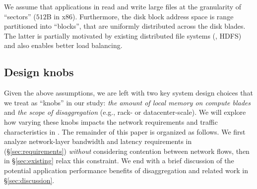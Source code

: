 
We assume that applications in \dis read and write large files at the granularity of ``sectors'' ($512$B in x86). Furthermore, the disk block address space is range partitioned into ``blocks'', that are uniformly distributed across the disk blades. The latter is partially motivated by existing distributed file systems (\eg, HDFS) and also enables better load balancing. %

\vspace{-0.1in}
\subsection{Design knobs}
\label{ssec:knobs}
\vspace{-0.05in}
Given the above assumptions, we are left with two key system design choices that we treat as ``knobs'' in our study: {\em the amount of local memory on compute blades} and  {\em the scope of disaggregation} (e.g., rack- or datacenter-scale). We will explore how varying these knobs impacts the network requirements and traffic characteristics in \dis. 
The remainder of this paper is organized as follows. We first analyze network-layer bandwidth and latency requirements in \dis(\S\ref{sec:requirements}) \emph{without} considering contention between network flows, then in \S\ref{sec:existing} relax this constraint. We end with a brief discussion of the potential application performance benefits of disaggregation and related work in \S\ref{sec:discussion}.